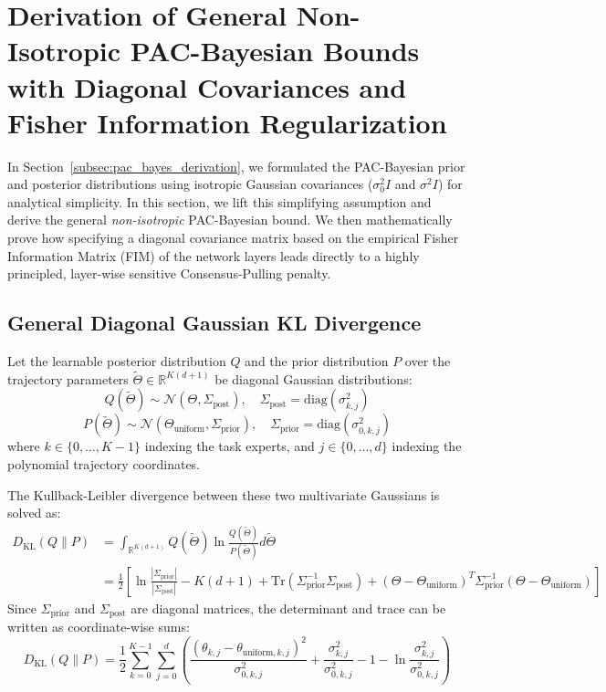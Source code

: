 \section{Derivation of General Non-Isotropic PAC-Bayesian Bounds with Diagonal Covariances and Fisher Information Regularization}
\label{app:non_isotropic_derivation}

In Section~\ref{subsec:pac_bayes_derivation}, we formulated the PAC-Bayesian prior and posterior distributions using isotropic Gaussian covariances ($\sigma_0^2 I$ and $\sigma^2 I$) for analytical simplicity. In this section, we lift this simplifying assumption and derive the general \emph{non-isotropic} PAC-Bayesian bound. We then mathematically prove how specifying a diagonal covariance matrix based on the empirical Fisher Information Matrix (FIM) of the network layers leads directly to a highly principled, layer-wise sensitive Consensus-Pulling penalty.

\subsection{General Diagonal Gaussian KL Divergence}
Let the learnable posterior distribution $Q$ and the prior distribution $P$ over the trajectory parameters $\tilde{\Theta} \in \mathbb{R}^{K(d+1)}$ be diagonal Gaussian distributions:
\begin{equation}
Q(\tilde{\Theta}) \sim \mathcal{N}\left(\Theta, \Sigma_{\text{post}}\right), \quad \Sigma_{\text{post}} = \mathrm{diag}\left(\sigma_{k, j}^2\right)
\end{equation}
\begin{equation}
P(\tilde{\Theta}) \sim \mathcal{N}\left(\Theta_{\text{uniform}}, \Sigma_{\text{prior}}\right), \quad \Sigma_{\text{prior}} = \mathrm{diag}\left(\sigma_{0, k, j}^2\right)
\end{equation}
where $k \in \{0, \dots, K-1\}$ indexing the task experts, and $j \in \{0, \dots, d\}$ indexing the polynomial trajectory coordinates.

The Kullback-Leibler divergence between these two multivariate Gaussians is solved as:
\begin{align}
D_{\text{KL}}(Q \parallel P) &= \int_{\mathbb{R}^{K(d+1)}} Q(\tilde{\Theta}) \ln \frac{Q(\tilde{\Theta})}{P(\tilde{\Theta})} d\tilde{\Theta} \\
&= \frac{1}{2} \left[ \ln \frac{|\Sigma_{\text{prior}}|}{|\Sigma_{\text{post}}|} - K(d+1) + \mathrm{Tr}\left(\Sigma_{\text{prior}}^{-1} \Sigma_{\text{post}}\right) + (\Theta - \Theta_{\text{uniform}})^T \Sigma_{\text{prior}}^{-1} (\Theta - \Theta_{\text{uniform}}) \right]
\end{align}
Since $\Sigma_{\text{prior}}$ and $\Sigma_{\text{post}}$ are diagonal matrices, the determinant and trace can be written as coordinate-wise sums:
\begin{equation}
\label{eq:diagonal_kl}
D_{\text{KL}}(Q \parallel P) = \frac{1}{2} \sum_{k=0}^{K-1} \sum_{j=0}^d \left( \frac{(\theta_{k,j} - \theta_{\text{uniform}, k, j})^2}{\sigma_{0, k, j}^2} + \frac{\sigma_{k, j}^2}{\sigma_{0, k, j}^2} - 1 - \ln \frac{\sigma_{k, j}^2}{\sigma_{0, k, j}^2} \right)
\end{equation}

